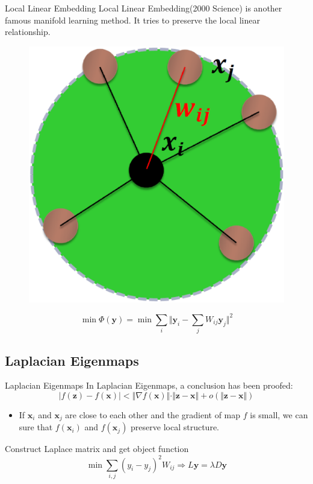 \documentclass{beamer}
\newcommand{\bol}[1]{\textbf{#1}}
\begin{document}
\begin{darkframes}
    \begin{frame}{Local Linear Embedding}
    \alert{Local Linear Embedding}(2000 Science) is another famous manifold learning method. It tries to preserve the local linear relationship.
    \begin{figure}
    \centering
    \includegraphics[scale=0.15]{./figs/fig8.eps}
    \end{figure}
	\begin{displaymath}
	\min\Phi(\bol{y}) = \min\sum_i\Vert \bol{y}_i - \sum_jW_{ij}\bol{y}_j  \Vert^2
	\end{displaymath}
    \end{frame}
    
    
    \subsection{Laplacian Eigenmaps}
    \begin{frame}{Laplacian Eigenmaps}
    In Laplacian Eigenmaps, a conclusion has been proofed: \\
    \begin{displaymath}
    	\vert f(\bol{z} ) - f(\bol{x})\vert < \Vert \nabla f(\bol{x}) \Vert\cdot \Vert \bol{z} - \bol{x} \Vert + o(\Vert \bol{z} - \bol{x} \Vert)
    \end{displaymath}
    \begin{itemize}
    \item If $\bol{x}_i$ and $\bol{x}_j$ are close to each other and the gradient of map $f$ is small, we can sure that $f(\bol{x}_i)$ and $f(\bol{x}_j)$ preserve local structure.
    \end{itemize}
    Construct Laplace matrix and get object function
    \begin{displaymath}
    	\min\sum_{i,j}(y_i - y_j)^2W_{ij} \Rightarrow L\bol{y} = \lambda D\bol{y}
    \end{displaymath}
    \end{frame}
    

\end{darkframes}
\end{document}
